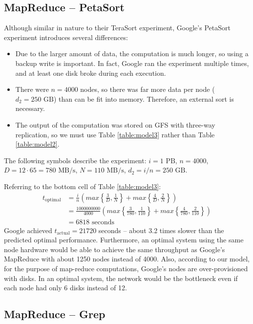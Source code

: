 \documentclass[ 11pt, letterpaper]{article}%
\begin{document}
\subsection{MapReduce -- PetaSort}

Although similar in nature to their TeraSort experiment, Google's PetaSort
experiment introduces several differences:
\begin{itemize}
  \item Due to the larger amount of data, the computation is much longer, so
  using a backup write is important. In fact, Google ran the experiment
  multiple times, and at least one disk broke during each execution.
  \item There were $n = 4000$ nodes, so there was far more data per node ($d_2
  = 250 \text{ GB}$) than can be fit into memory. Therefore, an external sort
  is necessary.
  \item The output of the computation was stored on GFS with three-way
  replication, so we must use Table \ref{table:model3} rather than Table
  \ref{table:model2}.
\end{itemize}

The following symbols describe
the experiment: $i = 1 \text{ PB}$, $n = 4000$, $D = 12 \cdot 65 = 780 \text{ MB/s}$, $N = 110
\text{ MB/s}$, $d_2 = i/n = 250 \text{ GB}$. 

Referring to the bottom cell of Table \ref{table:model3}:
\begin{align*}
t_\text{optimal}
  &= \frac{i}{n} \left( max\left\{\frac{3}{D},
\frac{1}{N}\right\} + max\left\{\frac{4}{D}, \frac{2}{N}\right\} \right)\\ 
  &= \frac{1000000000}{4000} \left( max\left\{\frac{3}{780},
 \frac{1}{110}\right\} + max\left\{\frac{4}{780}, \frac{2}{110}\right\}
 \right)\\ &= 6818 \text{ seconds} 
\end{align*}
Google achieved $t_\text{actual} = 21720$ seconds -- about 3.2 times slower than
the predicted optimal performance. Furthermore, an optimal system using
the same node hardware would be able to
achieve the same throughput as Google's MapReduce with about 1250 nodes instead
of 4000. Also, according to our model, for the purpose of map-reduce
computations, Google's nodes are over-provisioned with disks. In an optimal
system, the network would be the bottleneck even if each node had only 6
disks instead of 12.

\subsection{MapReduce -- Grep}
\end{document}
